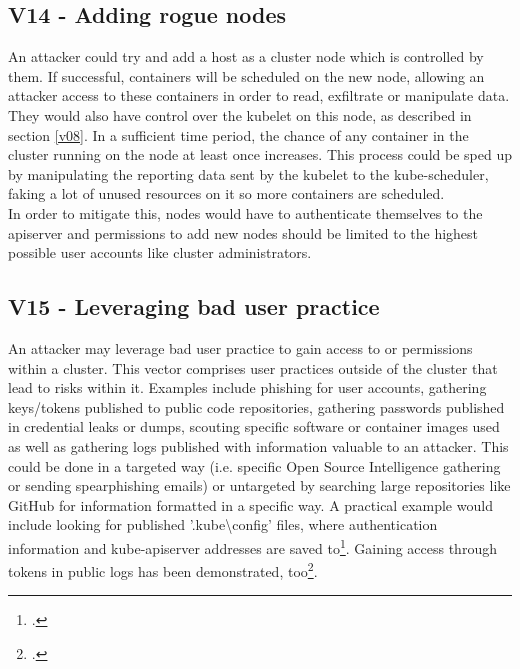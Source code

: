 \subsection{V14 - Adding rogue nodes}
\vspace{-0.25cm}
An attacker could try and add a host as a cluster node which is controlled by them. If successful, containers will be scheduled on the new node, allowing an attacker access to these containers in order to read, exfiltrate or manipulate data. They would also have control over the kubelet on this node, as described in section \ref{v08}.
In a sufficient time period, the chance of any container in the cluster running on the node at least once increases. This process could be sped up by manipulating the reporting data sent by the kubelet to the kube-scheduler, faking a lot of unused resources on it so more containers are scheduled. \\
In order to mitigate this, nodes would have to authenticate themselves to the apiserver and permissions to add new nodes should be limited to the highest possible user accounts like cluster administrators.

\vspace{-0.25cm}
\subsection{V15 - Leveraging bad user practice}
\vspace{-0.25cm}
An attacker may leverage bad user practice to gain access to or permissions within a cluster. 
This vector comprises user practices outside of the cluster that lead to risks within it.
Examples include phishing for user accounts, gathering keys/tokens published to public code repositories, gathering passwords published in credential leaks or dumps, scouting specific software or container images used as well as gathering logs published with information valuable to an attacker.
This could be done in a targeted way (i.e. specific Open Source Intelligence gathering or sending spearphishing emails) or untargeted by searching large repositories like GitHub for information formatted in a specific way. A practical example would include looking for published '.kube\textbackslash config' files, where authentication information and kube-apiserver addresses are saved to\footcite[][, section 'Define clusters, users, and contexts']{kubectlClusterAccess}. Gaining access through tokens in public logs has been demonstrated, too\footcite[][, section 'Results and notable findings']{ciKnew}.

